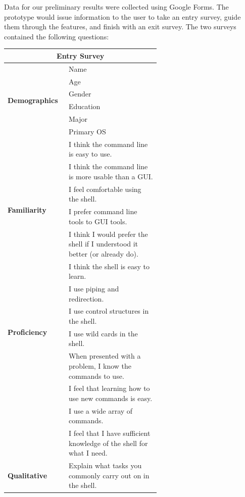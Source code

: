 Data for our preliminary results were collected using Google Forms. The
prototype would issue information to the user to take an entry survey, guide
them through the features, and finish with an exit survey. The two surveys
contained the following questions:

\begin{center}
  \begin{tabular}{|l|p{0.6\linewidth}|}
    \hline
    \multicolumn{2}{|c|}{\Large \textbf{Entry Survey}}\\
    \hline
    \multirow{6}{*}{\textbf{Demographics}}
 & Name \\ \cline{2-2}
 & Age \\\cline{2-2}
 & Gender \\\cline{2-2}
 & Education \\\cline{2-2}
 & Major \\\cline{2-2}
 & Primary OS \\
    \hline
    \multirow{6}{*}{\textbf{Familiarity}}
 & I think the command line is easy to use. \\ \cline{2-2}
 & I think the command line is more usable than a GUI. \\ \cline{2-2}
 & I feel comfortable using the shell. \\ \cline{2-2}
 & I prefer command line tools to GUI tools.\\ \cline{2-2}
 & I think I would prefer the shell if I understood it better (or already
   do).\\ \cline{2-2}
 & I think the shell is easy to learn.\\
    \hline
    \multirow{4}{*}{\textbf{Proficiency}}
 & I use piping and redirection. \\ \cline{2-2}
 & I use control structures in the shell.\\ \cline{2-2}
 & I use wild cards in the shell.\\
    \hline
    \multirow{5}{*}{\textbf{Confidence}}
 & When presented with a problem, I know the commands to use. \\ \cline{2-2}
 & I feel that learning how to use new commands is easy. \\ \cline{2-2}
 & I use a wide array of commands. \\ \cline{2-2}
 & I feel that I have sufficient knowledge of the shell for what I need. \\
    \hline
    \multirow{1}{*}{\textbf{Qualitative}} & Explain what tasks you commonly carry
                                            out on in the shell.\\
    \hline
  \end{tabular}
\end{center}

